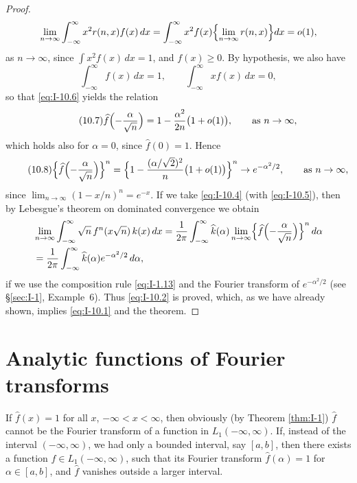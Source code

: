 \begin{proof}
\begin{equation*}
\lim_{n\to\infty}\int_{-\infty}^{\infty}x^{2}r(n,x)f(x)\,dx
=\int_{-\infty}^{\infty}x^{2}f(x)\Bigl\{\lim_{n\to\infty}r(n,x)\Bigr\}dx
=o(1),
\end{equation*}
as $n\to\infty$, since $\int x^{2}f(x)\,dx=1$, and $f(x)\ge 0$. By hypothesis, we also have
\begin{equation*}
\int_{-\infty}^{\infty}f(x)\,dx=1,\qquad \int_{-\infty}^{\infty}xf(x)\,dx=0,
\end{equation*}
so that \eqref{eq:I-10.6} yields the relation
\begin{equation}\label{eq:I-10.7}\tag{10.7}
\widehat f\Bigl(-\frac{\alpha}{\sqrt n}\Bigr)
=1-\frac{\alpha^{2}}{2n}\bigl(1+o(1)\bigr),\qquad\text{as }n\to\infty,
\end{equation}
which holds also for $\alpha=0$, since $\widehat f(0)=1$. Hence
\begin{equation}\label{eq:I-10.8}\tag{10.8}
\Bigl\{\widehat f\Bigl(-\frac{\alpha}{\sqrt n}\Bigr)\Bigr\}^n
=\Bigl\{1-\frac{(\alpha/\sqrt2)^{2}}{n}\bigl(1+o(1)\bigr)\Bigr\}^n
\to e^{-\alpha^{2}/2},\qquad\text{as }n\to\infty,
\end{equation}
since $\lim_{n\to\infty}(1-x/n)^n=e^{-x}$. If we take \eqref{eq:I-10.4} (with \eqref{eq:I-10.5}), then by Lebesgue's theorem on dominated convergence we obtain
\begin{equation*}
\begin{aligned}
&\lim_{n\to\infty}\int_{-\infty}^{\infty}\sqrt n\,f^n(x\sqrt n)\,k(x)\,dx = \frac{1}{2\pi}\int_{-\infty}^{\infty}\widehat k(\alpha)\lim_{n\to\infty}\Bigl\{\widehat f\Bigl(-\frac{\alpha}{\sqrt n}\Bigr)\Bigr\}^n\,d\alpha\\
&= \frac{1}{2\pi}\int_{-\infty}^{\infty}\widehat k(\alpha)e^{-\alpha^{2}/2}\,d\alpha,
\end{aligned}
\end{equation*}
if we use the composition rule \eqref{eq:I-1.13} and the Fourier transform of $e^{-\alpha^{2}/2}$ (see \S\ref{sec:I-1}, Example~6). Thus \eqref{eq:I-10.2} is proved, which, as we have already shown, implies \eqref{eq:I-10.1} and the theorem.
\end{proof}

\section{Analytic functions of Fourier transforms}
\label{sec:I-11}

If $\widehat f(x)=1$ for all $x$, $-\infty<x<\infty$, then obviously (by Theorem \ref{thm:I-1}) $\widehat f$ cannot be the Fourier transform of a function in $L_1(-\infty,\infty)$. If, instead of the interval $(-\infty,\infty)$, we had only a bounded interval, say $[a,b]$, then there exists a function $f\in L_1(-\infty,\infty)$, such that its Fourier transform $\widehat f(\alpha)=1$ for $\alpha\in[a,b]$, and $\widehat f$ vanishes outside a larger interval.

